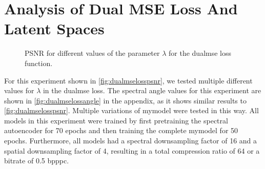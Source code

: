 \section{Analysis of Dual MSE Loss And Latent Spaces \label{sec:ch5dualmse}}
\begin{figure}
	\centering
	\datatable
	\caption[Dual MSE Loss Analysis]{PSNR for different values of the parameter $\lambda$ for the \ac{dualmse} loss function.}
	\label{fig:dualmselosspsnr}
	\end{figure}
For this experiment shown in \autoref{fig:dualmselosspsnr}, we tested multiple different values for $\lambda$ in the \ac{dualmse} loss. The spectral angle values for this experiment are shown in \autoref{fig:dualmselossangle} in the appendix, as it shows similar results to \autoref{fig:dualmselosspsnr}. Multiple variations of \ac{mymodel} were tested in this way. All models in this experiment were trained by first pretraining the spectral autoencoder for 70 epochs and then training the complete \ac{mymodel} for 50 epochs. Furthermore, all models had a spectral downsampling factor of 16 and a spatial downsampling factor of 4, resulting in a total compression ratio of 64 or a bitrate of 0.5 \ac{bpppc}.

